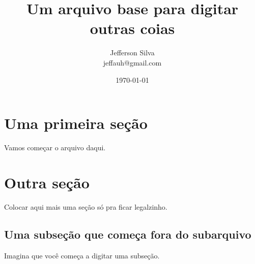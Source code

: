 \documentclass[11p, %
			   openany, %
			   twoside, %
			   brazil %
			   ]{article}
\title{Um arquivo base para digitar outras coias}   	%
\author{Jefferson Silva \\								%
		\small{jeffauh@gmail.com}
		}
\date{\today}											%
\theoremstyle{thm}							%
\theoremstyle{definicao}
\begin{document}
\maketitle						%

\frenchspacing					%
\onehalfspacing					%

\section{Uma primeira seção}

Vamos começar o arquivo daqui.



\section{Outra seção}

Colocar aqui mais uma seção só pra ficar legalzinho.

\subsection{Uma subseção que começa fora do subarquivo}

Imagina que você começa a digitar uma subseção. 


\nocite{*}						  %
\end{document}
